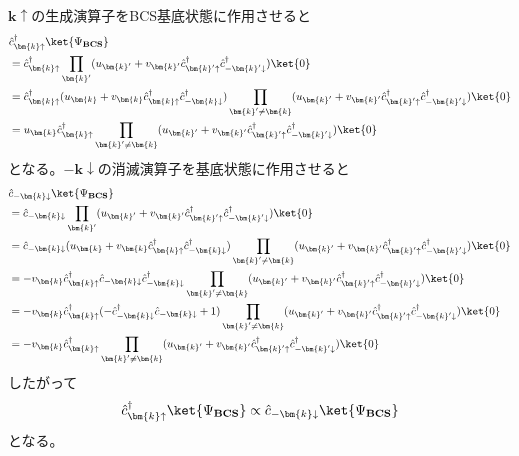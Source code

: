 \documentclass[dvipdfmx, 11pt, a4paper]{jsarticle}
\numberwithin{equation}{section}
\theoremstyle{definition}
\begin{document}
    \begin{derivationBox}
        $\bm{k}\uparrow$の生成演算子をBCS基底状態に作用させると
        \begin{align}
            &\hat{c}_{\bm{k}\uparrow}^\dagger\ket{\Psi_{\textbf{BCS}}} \notag \\
            &= \hat{c}_{\bm{k}\uparrow}^\dagger \prod_{\bm{k}'} (u_{\bm{k}'}+v_{\bm{k}'}\hat{c}_{\bm{k}'\uparrow}^\dagger \hat{c}_{-\bm{k}'\downarrow}^\dagger)\ket{0} \notag \\
            &= \hat{c}_{\bm{k}\uparrow}^\dagger (u_{\bm{k}}+v_{\bm{k}}\hat{c}_{\bm{k}\uparrow}^\dagger \hat{c}_{-\bm{k}\downarrow}^\dagger)\prod_{\bm{k}'\ne \bm{k}} (u_{\bm{k}'}+v_{\bm{k}'}\hat{c}_{\bm{k}'\uparrow}^\dagger \hat{c}_{-\bm{k}'\downarrow}^\dagger)\ket{0} \notag \\
            &= u_{\bm{k}}\hat{c}_{\bm{k}\uparrow}^\dagger  \prod_{\bm{k}'\ne \bm{k}} (u_{\bm{k}'}+v_{\bm{k}'}\hat{c}_{\bm{k}'\uparrow}^\dagger \hat{c}_{-\bm{k}'\downarrow}^\dagger)\ket{0}
        \end{align}
        となる。$-\bm{k}\downarrow$の消滅演算子を基底状態に作用させると
        \begin{align}
            &\hat{c}_{-\bm{k}\downarrow} \ket{\Psi_{\textbf{BCS}}} \notag \\
            &= \hat{c}_{-\bm{k}\downarrow} \prod_{\bm{k}'} (u_{\bm{k}'}+v_{\bm{k}'}\hat{c}_{\bm{k}'\uparrow}^\dagger \hat{c}_{-\bm{k}'\downarrow}^\dagger)\ket{0} \notag \\
            &= \hat{c}_{-\bm{k}\downarrow} (u_{\bm{k}}+v_{\bm{k}}\hat{c}_{\bm{k}\uparrow}^\dagger \hat{c}_{-\bm{k}\downarrow}^\dagger)\prod_{\bm{k}'\ne\bm{k}} (u_{\bm{k}'}+v_{\bm{k}'}\hat{c}_{\bm{k}'\uparrow}^\dagger \hat{c}_{-\bm{k}'\downarrow}^\dagger)\ket{0} \notag \\
            &=  -v_{\bm{k}}\hat{c}_{\bm{k}\uparrow}^\dagger \hat{c}_{-\bm{k}\downarrow}\hat{c}_{-\bm{k}\downarrow}^\dagger \prod_{\bm{k}'\ne\bm{k}} (u_{\bm{k}'}+v_{\bm{k}'}\hat{c}_{\bm{k}'\uparrow}^\dagger \hat{c}_{-\bm{k}'\downarrow}^\dagger)\ket{0} \notag \\
            &=  -v_{\bm{k}}\hat{c}_{\bm{k}\uparrow}^\dagger (-\hat{c}_{-\bm{k}\downarrow}^\dagger \hat{c}_{-\bm{k}\downarrow} + 1) \prod_{\bm{k}'\ne\bm{k}} (u_{\bm{k}'}+v_{\bm{k}'}\hat{c}_{\bm{k}'\uparrow}^\dagger \hat{c}_{-\bm{k}'\downarrow}^\dagger)\ket{0} \notag \\
            &=  -v_{\bm{k}}\hat{c}_{\bm{k}\uparrow}^\dagger \prod_{\bm{k}'\ne\bm{k}} (u_{\bm{k}'}+v_{\bm{k}'}\hat{c}_{\bm{k}'\uparrow}^\dagger \hat{c}_{-\bm{k}'\downarrow}^\dagger)\ket{0}
        \end{align}
        したがって
        \begin{align}
            \hat{c}_{\bm{k}\uparrow}^\dagger\ket{\Psi_{\textbf{BCS}}} \propto \hat{c}_{-\bm{k}\downarrow}\ket{\Psi_{\textbf{BCS}}}
        \end{align}
        となる。
    \end{derivationBox}
\end{document}
